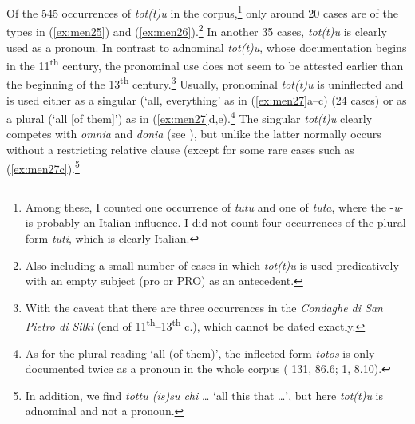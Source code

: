 \documentclass[output=paper,colorlinks,citecolor=brown]{langscibook}
\begin{document}
Of the 545 occurrences of \textit{tot(t)u} in the corpus,\footnote{Among these, I counted one occurrence of \textit{tutu} and one of \textit{tuta}, where the -\textit{u}- is probably an Italian influence. I did not count four occurrences of the plural form \textit{tuti}, which is clearly Italian.} only around 20 cases are of the types in (\ref{ex:men25}) and (\ref{ex:men26}).\footnote{Also including a small number of cases in which \textit{tot(t)u} is used predicatively with an empty subject (pro or PRO) as an antecedent.} In another 35 cases, \textit{tot(t)u} is clearly used as a pronoun. In contrast to adnominal \textit{tot(t)u}, whose documentation begins in the 11\textsuperscript{th} century, the pronominal use does not seem to be attested earlier than the beginning of the 13\textsuperscript{th} century.\footnote{With the caveat that there are three occurrences in the \textit{Condaghe di San Pietro di Silki} (end of 11\textsuperscript{th}--13\textsuperscript{th} c.), which cannot be dated exactly.} Usually, pronominal \textit{tot(t)u} is uninflected and is used either as a singular (‘all, everything’ as in (\ref{ex:men27}a--c) (24 cases) or as a plural (‘all [of them]’) as in (\ref{ex:men27}d,e).\footnote{As for the plural reading ‘all (of them)’, the inflected form \textit{totos} is only documented twice as a pronoun in the whole corpus ( 131, 86.6;  1, 8.10).} The singular \textit{tot(t)u} clearly competes with \textit{omnia} and \textit{donia} (see ), but unlike the latter normally occurs without a restricting relative clause (except for some rare cases such as (\ref{ex:men27c}).\footnote{In addition, we find \textit{tottu (is)su chi} … ‘all this that …’, but here \textit{tot(t)u} is adnominal and not a pronoun.}
\end{document}
